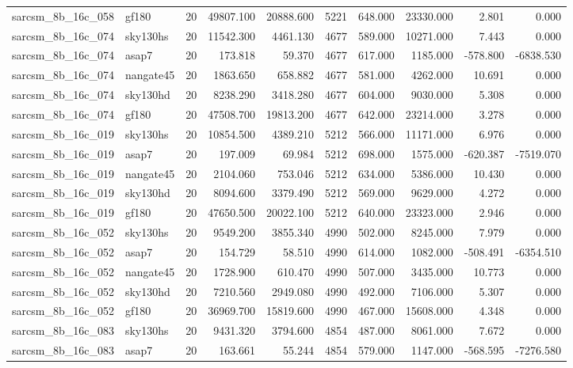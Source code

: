 \begin{tabular}{llrrrrrrrr}
sarcsm\_8b\_16c\_058 & gf180 & 20 & 49807.100 & 20888.600 & 5221 & 648.000 & 23330.000 & 2.801 & 0.000 \\
sarcsm\_8b\_16c\_074 & sky130hs & 20 & 11542.300 & 4461.130 & 4677 & 589.000 & 10271.000 & 7.443 & 0.000 \\
sarcsm\_8b\_16c\_074 & asap7 & 20 & 173.818 & 59.370 & 4677 & 617.000 & 1185.000 & -578.800 & -6838.530 \\
sarcsm\_8b\_16c\_074 & nangate45 & 20 & 1863.650 & 658.882 & 4677 & 581.000 & 4262.000 & 10.691 & 0.000 \\
sarcsm\_8b\_16c\_074 & sky130hd & 20 & 8238.290 & 3418.280 & 4677 & 604.000 & 9030.000 & 5.308 & 0.000 \\
sarcsm\_8b\_16c\_074 & gf180 & 20 & 47508.700 & 19813.200 & 4677 & 642.000 & 23214.000 & 3.278 & 0.000 \\
sarcsm\_8b\_16c\_019 & sky130hs & 20 & 10854.500 & 4389.210 & 5212 & 566.000 & 11171.000 & 6.976 & 0.000 \\
sarcsm\_8b\_16c\_019 & asap7 & 20 & 197.009 & 69.984 & 5212 & 698.000 & 1575.000 & -620.387 & -7519.070 \\
sarcsm\_8b\_16c\_019 & nangate45 & 20 & 2104.060 & 753.046 & 5212 & 634.000 & 5386.000 & 10.430 & 0.000 \\
sarcsm\_8b\_16c\_019 & sky130hd & 20 & 8094.600 & 3379.490 & 5212 & 569.000 & 9629.000 & 4.272 & 0.000 \\
sarcsm\_8b\_16c\_019 & gf180 & 20 & 47650.500 & 20022.100 & 5212 & 640.000 & 23323.000 & 2.946 & 0.000 \\
sarcsm\_8b\_16c\_052 & sky130hs & 20 & 9549.200 & 3855.340 & 4990 & 502.000 & 8245.000 & 7.979 & 0.000 \\
sarcsm\_8b\_16c\_052 & asap7 & 20 & 154.729 & 58.510 & 4990 & 614.000 & 1082.000 & -508.491 & -6354.510 \\
sarcsm\_8b\_16c\_052 & nangate45 & 20 & 1728.900 & 610.470 & 4990 & 507.000 & 3435.000 & 10.773 & 0.000 \\
sarcsm\_8b\_16c\_052 & sky130hd & 20 & 7210.560 & 2949.080 & 4990 & 492.000 & 7106.000 & 5.307 & 0.000 \\
sarcsm\_8b\_16c\_052 & gf180 & 20 & 36969.700 & 15819.600 & 4990 & 467.000 & 15608.000 & 4.348 & 0.000 \\
sarcsm\_8b\_16c\_083 & sky130hs & 20 & 9431.320 & 3794.600 & 4854 & 487.000 & 8061.000 & 7.672 & 0.000 \\
sarcsm\_8b\_16c\_083 & asap7 & 20 & 163.661 & 55.244 & 4854 & 579.000 & 1147.000 & -568.595 & -7276.580 \\

\end{tabular}
